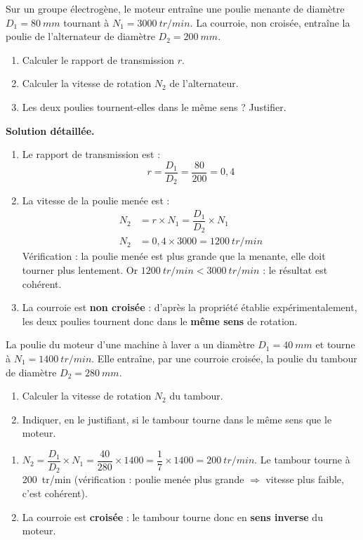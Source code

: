 \documentclass[11pt]{article}
\begin{document}
\begin{exoresolu}
Sur un groupe électrogène, le moteur entraîne une poulie menante de diamètre $D_1 = \SI{80}{mm}$ tournant à $N_1 = \SI{3000}{tr/min}$. La courroie, non croisée, entraîne la poulie de l'alternateur de diamètre $D_2 = \SI{200}{mm}$.
\begin{enumerate}
\item Calculer le rapport de transmission $r$.
\item Calculer la vitesse de rotation $N_2$ de l'alternateur.
\item Les deux poulies tournent-elles dans le même sens ? Justifier.
\end{enumerate}
\tcblower
\textbf{Solution détaillée.}
\begin{enumerate}
\item Le rapport de transmission est :
\[ r = \dfrac{D_1}{D_2} = \dfrac{80}{200} = 0,4 \]
\item La vitesse de la poulie menée est :
\begin{align*}
N_2 &= r \times N_1 = \dfrac{D_1}{D_2} \times N_1 \\
N_2 &= 0,4 \times 3000 = \SI{1200}{tr/min}
\end{align*}
Vérification : la poulie menée est plus grande que la menante, elle doit tourner plus lentement. Or $\SI{1200}{tr/min} < \SI{3000}{tr/min}$ : le résultat est cohérent.
\item La courroie est \textbf{non croisée} : d'après la propriété établie expérimentalement, les deux poulies tournent donc dans le \textbf{même sens} de rotation.
\end{enumerate}
\end{exoresolu}

\begin{exercice}
La poulie du moteur d'une machine à laver a un diamètre $D_1 = \SI{40}{mm}$ et tourne à $N_1 = \SI{1400}{tr/min}$. Elle entraîne, par une courroie croisée, la poulie du tambour de diamètre $D_2 = \SI{280}{mm}$.
\begin{enumerate}
\item Calculer la vitesse de rotation $N_2$ du tambour.
\item Indiquer, en le justifiant, si le tambour tourne dans le même sens que le moteur.
\end{enumerate}
\end{exercice}

\begin{corrige}
\begin{enumerate}
\item $N_2 = \dfrac{D_1}{D_2} \times N_1 = \dfrac{40}{280} \times 1400 = \dfrac{1}{7} \times 1400 = \SI{200}{tr/min}$. Le tambour tourne à \SI{200}{tr/min} (vérification : poulie menée plus grande $\Rightarrow$ vitesse plus faible, c'est cohérent).
\item La courroie est \textbf{croisée} : le tambour tourne donc en \textbf{sens inverse} du moteur.
\end{enumerate}
\end{corrige}
\end{document}
